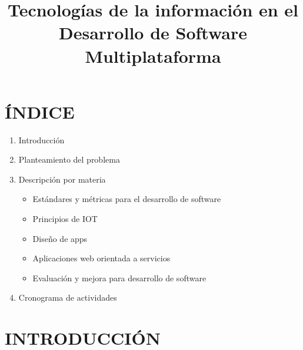 \documentclass[conference]{IEEEtran}
\begin{document}
\title{Tecnologías de la información en el Desarrollo de Software Multiplataforma}

\author{
}

\maketitle

\section{ÍNDICE}

\begin{enumerate}
  \item Introducción
  \item Planteamiento del problema
  \item Descripción por materia
  \begin{itemize}
    \item Estándares y métricas para el desarrollo de software
    \item Principios de IOT
    \item Diseño de apps
    \item Aplicaciones web orientada a servicios
    \item Evaluación y mejora para desarrollo de software
  \end{itemize}
  \item Cronograma de actividades
\end{enumerate}

\section{INTRODUCCIÓN}
\end{document}
